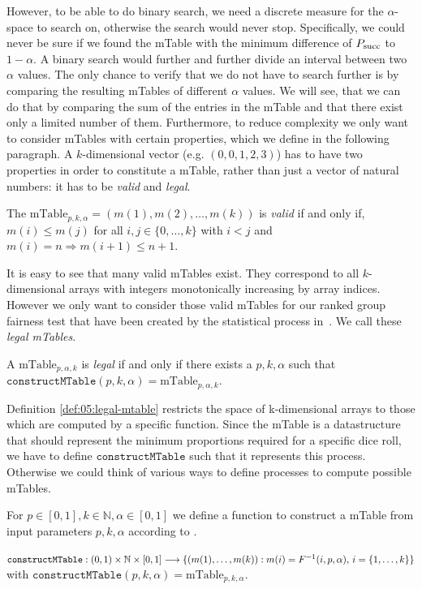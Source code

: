 However, to be able to do binary search, we need a discrete measure for the $\alpha$-space to search on, otherwise the search would never stop. Specifically, we could never be sure if we found the mTable with the minimum difference of $P_{\operatorname{succ}}$ to $1-\alpha$. A binary search would further and further divide an interval between two $\alpha$ values. The only chance to verify that we do not have to search further is by comparing the resulting mTables of different $\alpha$ values. We will see, that we can do that by comparing the sum of the entries in the mTable and that there exist only a limited number of them.
%
Furthermore, to reduce complexity we only want to consider mTables with certain properties, which we define in the following paragraph. 
%
A $k$-dimensional vector (e.g. $(0,0,1,2,3)$) has to have two properties in order to constitute a mTable, rather than just a vector of natural numbers: it has to be \emph{valid} and \emph{legal}.
%
\begin{definition}
	\label{def:05:valid-mtable}
	The $\text{mTable}_{p,k,\alpha}=(m(1) , m(2) , \ldots , m(k))$ is \emph{valid} if and only if, $m(i) \leq m(j)$ for all $i,j \in \lbrace 0, \ldots, k \rbrace$ with $i < j$ and $m(i)=n \Rightarrow m(i+1) \leq n+1$.
\end{definition}
\noindent It is easy to see that many valid mTables exist.
%
They correspond to all $k$-dimensional arrays with integers monotonically increasing by array indices.
%
However we only want to consider those valid mTables for our ranked group fairness test that have been created by the statistical process in~\citet{yang2016measuring}.
%
We call these \textit{legal mTables}.
%
\begin{definition}
	\label{def:05:legal-mtable}
	A $\text{mTable}_{p,\alpha,k}$ is \textit{legal} if and only if there exists a $p,k,\alpha$ such that
	$\texttt{constructMTable}(p,k,\alpha)=\text{mTable}_{p,\alpha,k}$.
\end{definition}
%
Definition \ref{def:05:legal-mtable} restricts the space of k-dimensional arrays to those which are computed by a specific function. Since the mTable is a datastructure that should represent the minimum proportions required for a specific dice roll, we have to define $\texttt{constructMTable}$ such that it represents this process. Otherwise we could think of various ways to define processes to compute possible mTables.
\begin{definition}[constructMTable]
	\label{def:05:construct-mtable-single-test}
	For $p\in [0,1], k \in \mathbb{N}, \alpha \in [0,1]$ we define a function to construct a mTable from input parameters $p, k, \alpha$ according to \cite{yang2016measuring}.
	
	\noindent$\texttt{constructMTable} : \\ (0,1) \times \mathbb{N} \times [0,1] \longrightarrow \lbrace (m(1) ,\ldots, m(k)): m(i) = F^{-1}(i,p,\alpha), \, i = \{1,\ldots,k\}\rbrace$ \\
	with $\texttt{constructMTable}(p,k,\alpha)=\text{mTable}_{p,k,\alpha}$.
\end{definition}
